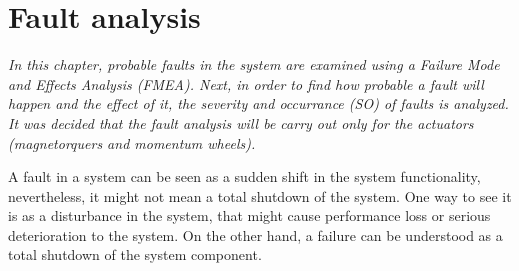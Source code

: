 \chapter{Fault  analysis}
\textit{In this chapter, probable faults in the system are examined using a Failure Mode and Effects Analysis (FMEA). Next, in order to find how probable a fault will happen and the effect of it, the severity and occurrance (SO) of faults is analyzed. It was decided that the fault analysis will be carry out only for the actuators (magnetorquers and momentum wheels).}

A fault in a system can be seen as a sudden shift in the system functionality, nevertheless, it might not mean a total shutdown of the system. One way to see it is as a disturbance in the system, that might cause performance loss or serious deterioration to the system. On the other hand, a failure can be understood as a total shutdown of the system component. 

